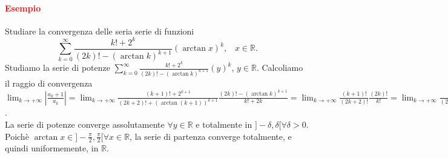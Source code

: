 \documentclass{article}
\newcommand{\R}{\mathbb{R}}
\begin{document}
\paragraph{\textcolor{red}{Esempio}}
Studiare la convergenza delle seria serie di funzioni
\begin{equation*}
    \sum_{k=0}^{\infty}\frac{k!+2^k}{(2k)!-(\arctan k)^{k+1}}(\arctan x)^k,\,\,\,\,\, x \in \R.
\end{equation*}
Studiamo la serie di potenze $\sum_{k=0}^{\infty}\frac{k!+2^k}{(2k)!-(\arctan k)^{k+1}}(y)^k$, $y \in \R$. Calcoliamo il raggio di convergenza $\lim_{k\rightarrow +\infty}|\frac{a_k+1}{a_k}|=\lim_{k\rightarrow+\infty}\frac{(k+1)!+2^{k+1}}{(2k+2)!+(\arctan(k+1))^{k+1}}\frac{(2k)!-(\arctan k)^{k+1}}{k!+2k}=\lim_{k \rightarrow+\infty} \frac{(k+1)!}{(2k+2)!}\frac{(2k)!}{k!}=\lim_{k\rightarrow +\infty}\frac{k+1}{(2k+2)(2k+1)}=0 \Rightarrow R =+\infty$.\\
La serie di potenze converge assolutamente $\forall y \in \R$ e totalmente in $]-\delta,\delta[\forall \delta >0$. Poichè $\arctan x \in ]-\frac{\pi}{2},\frac{\pi}{2}[ \forall x \in \R$, la serie di partenza converge totalmente, e quindi uniformemente, in $\R$. 
\end{document}
